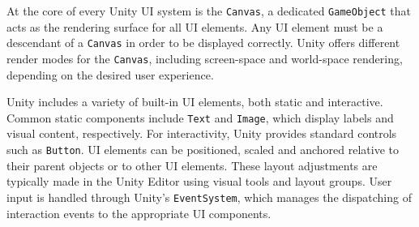 At the core of every Unity UI system is the \verb|Canvas|, a dedicated \verb|GameObject| that acts as the rendering surface for all UI elements. Any UI element must be a descendant of a \verb|Canvas| in order to be displayed correctly. Unity offers different render modes for the \verb|Canvas|, including screen-space and world-space rendering, depending on the desired user experience.

Unity includes a variety of built-in UI elements, both static and interactive. Common static components include \verb|Text| and \verb|Image|, which display labels and visual content, respectively. For interactivity, Unity provides standard controls such as \verb|Button|. UI elements can be positioned, scaled and anchored relative to their parent objects or to other UI elements. These layout adjustments are typically made in the Unity Editor using visual tools and layout groups. User input is handled through Unity’s \verb|EventSystem|, which manages the dispatching of interaction events to the appropriate UI components.
